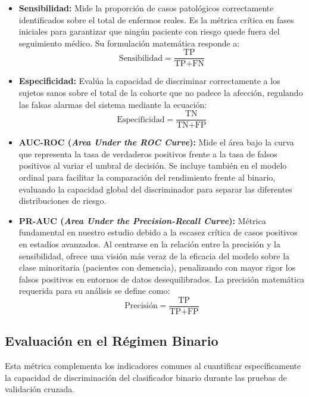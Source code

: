 \documentclass[12pt, oneside, english, spanish]{book}
\begin{document}
\begin{itemize}
	\item \textbf{Sensibilidad:} Mide la proporción de casos patológicos correctamente identificados sobre el total de enfermos reales. Es la métrica crítica en fases iniciales para garantizar que ningún paciente con riesgo quede fuera del seguimiento médico. Su formulación matemática responde a:
	\begin{equation}
		\text{Sensibilidad} = \frac{\text{TP}}{\text{TP} + \text{FN}}
	\end{equation}
	
	\item \textbf{Especificidad:} Evalúa la capacidad de discriminar correctamente a los sujetos sanos sobre el total de la cohorte que no padece la afección, regulando las falsas alarmas del sistema mediante la ecuación:
	\begin{equation}
		\text{Especificidad} = \frac{\text{TN}}{\text{TN} + \text{FP}}
	\end{equation}
	
	\item \textbf{AUC-ROC (\textit{Area Under the ROC Curve}):} Mide el área bajo la curva que representa la tasa de verdaderos positivos frente a la tasa de falsos positivos al variar el umbral de decisión. Se incluye también en el modelo ordinal para facilitar la comparación del rendimiento frente al binario, evaluando la capacidad global del discriminador para separar las diferentes distribuciones de riesgo.
	
	\item \textbf{PR-AUC (\textit{Area Under the Precision-Recall Curve}):} Métrica fundamental en nuestro estudio debido a la escasez crítica de casos positivos en estadios avanzados. Al centrarse en la relación entre la precisión y la sensibilidad, ofrece una visión más veraz de la eficacia del modelo sobre la clase minoritaria (pacientes con demencia), penalizando con mayor rigor los falsos positivos en entornos de datos desequilibrados. La precisión matemática requerida para su análisis se define como:
	\begin{equation}
		\text{Precisión} = \frac{\text{TP}}{\text{TP} + \text{FP}}
	\end{equation}
\end{itemize}

\subsection{Evaluación en el Régimen Binario} \label{subsec:metricas_binario}
Esta métrica complementa los indicadores comunes al cuantificar específicamente la capacidad de discriminación del clasificador binario durante las pruebas de validación cruzada.
\end{document}

